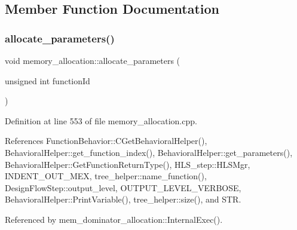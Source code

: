\subsection{Member Function Documentation}
\mbox{\label{classmemory__allocation_aa7ac453565415a72d89c814c8206bbba}} 
\subsubsection{\texorpdfstring{allocate\+\_\+parameters()}{allocate\_parameters()}}
{\footnotesize\ttfamily void memory\+\_\+allocation\+::allocate\+\_\+parameters (\begin{DoxyParamCaption}\item[{unsigned int}]{function\+Id }\end{DoxyParamCaption})}



Definition at line 553 of file memory\+\_\+allocation.\+cpp.



References Function\+Behavior\+::\+C\+Get\+Behavioral\+Helper(), Behavioral\+Helper\+::get\+\_\+function\+\_\+index(), Behavioral\+Helper\+::get\+\_\+parameters(), Behavioral\+Helper\+::\+Get\+Function\+Return\+Type(), H\+L\+S\+\_\+step\+::\+H\+L\+S\+Mgr, I\+N\+D\+E\+N\+T\+\_\+\+O\+U\+T\+\_\+\+M\+EX, tree\+\_\+helper\+::name\+\_\+function(), Design\+Flow\+Step\+::output\+\_\+level, O\+U\+T\+P\+U\+T\+\_\+\+L\+E\+V\+E\+L\+\_\+\+V\+E\+R\+B\+O\+SE, Behavioral\+Helper\+::\+Print\+Variable(), tree\+\_\+helper\+::size(), and S\+TR.



Referenced by mem\+\_\+dominator\+\_\+allocation\+::\+Internal\+Exec().

